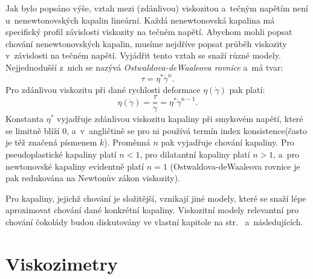 \documentclass[12pt]{article}
\begin{document}
Jak bylo popsáno výše, vztah mezi (zdánlivou) viskozitou a~tečným napětím není u~nenewtonovských kapalin lineární. Každá nenewtonovská kapalina má specifický profil závislosti viskozity na tečném napětí. Abychom mohli popsat chování nenewtonovských kapalin, musíme nejdříve popsat průběh viskozity v~závislosti na tečném napětí. Vyjádřit tento vztah se snaží různé modely. Nejjednodušší z~nich se nazývá \emph{Ostwaldova-deWaaleova rovnice} a~má tvar:~\cite{online:Skripta_viskozni_latky}\cite{wiki:Power-law_fluid}
\begin{equation}
    \tau = \eta^{*}\dot\gamma^n\text{.}
    \label{eq:ostwald_dewaale}
\end{equation}
Pro zdánlivou viskozitu při dané rychlosti deformace $\eta(\dot\gamma)$ pak platí:
\begin{equation}
    \eta(\dot\gamma) = \frac{\tau}{\dot\gamma} = \eta^*\dot\gamma^{n-1}\text{.}
\end{equation}
Konstanta $\eta^*$ vyjadřuje zdánlivou viskozitu kapaliny při smykovém napětí, které se limitně blíží $0$, a~v~angličtině se pro ni používá termín \glqq index konsistence\grqq\space(často je též značená písmenem $k$). Proměnná $n$ pak vyjadřuje chování kapaliny. Pro pseudoplastické kapaliny platí $n < 1$, pro dilatantní kapaliny platí $n > 1$, a~pro newtonovské kapaliny evidentně platí $n = 1$ (Ostwaldova-deWaaleova rovnice je pak redukována na Newtonův zákon viskozity).
\par
Pro kapaliny, jejichž chování je složitější, vznikají jiné modely, které se snaží lépe aproximovat chování dané konkrétní kapaliny. Viskozitní modely relevantní pro chování čokolády budou diskutovány ve vlastní kapitole na str.~\pageref{sec:Reologické_vlastnosti_čokolády} a~následujících.

\newpage%
\section{Viskozimetry}%
\end{document}
